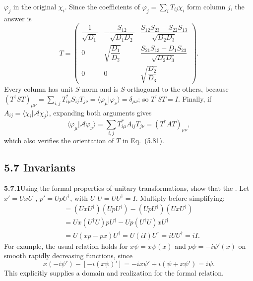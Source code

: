 $\varphi_j$ in the original $\chi_i$. Since the coefficients of
$\varphi_j=\sum_iT_{ij}\chi_i$ form column $j$, the answer is
\[
\boxed{T=\begin{pmatrix}
\dfrac1{\sqrt{D_1}}&-\dfrac{S_{12}}{\sqrt{D_1D_2}}&
\dfrac{S_{12}S_{23}-S_{22}S_{13}}{\sqrt{D_2D_3}}\\[2ex]
0&\sqrt{\dfrac{D_1}{D_2}}&
\dfrac{S_{21}S_{13}-D_1S_{23}}{\sqrt{D_2D_3}}\\[2ex]
0&0&\sqrt{\dfrac{D_2}{D_3}}
\end{pmatrix}.}
\]
Every column has unit $S$-norm and is $S$-orthogonal to the others,
because $(T^\dagger ST)_{\mu\nu}=\sum_{i,j}T_{i\mu}^*S_{ij}T_{j\nu}
=\langle\varphi_\mu|\varphi_\nu\rangle=\delta_{\mu\nu}$; so
$T^\dagger ST=I$. Finally, if $A_{ij}=\langle\chi_i|\mathcal A\chi_j\rangle$,
expanding both arguments gives
\[
\langle\varphi_\mu|\mathcal A\varphi_\nu\rangle
=\sum_{i,j}T_{i\mu}^*A_{ij}T_{j\nu}=(T^\dagger AT)_{\mu\nu},
\]
which also verifies the orientation of $T$ in Eq.~(5.81).

\subsection*{5.7 Invariants}

\par\bigskip
\noindent\textbf{5.7.1}\quad Using the formal properties of unitary
transformations, show that the .
\solution
Let $x'=UxU^\dagger$, $p'=UpU^\dagger$, with
$U^\dagger U=UU^\dagger=I$. Multiply before simplifying:
\begin{align*}
[x',p']
&=(UxU^\dagger)(UpU^\dagger)-(UpU^\dagger)(UxU^\dagger)\\
&=Ux(U^\dagger U)pU^\dagger-Up(U^\dagger U)xU^\dagger\\
&=U(xp-px)U^\dagger=U(iI)U^\dagger
=iUU^\dagger=\boxed{iI}.
\end{align*}
For example, the usual relation holds for
$x\psi=x\psi(x)$ and $p\psi=-i\psi'(x)$ on smooth rapidly decreasing
functions, since
\[
x(-i\psi')-[-i(x\psi)']=-ix\psi'+i(\psi+x\psi')=i\psi.
\]
This explicitly supplies a domain and realization for the formal relation.

